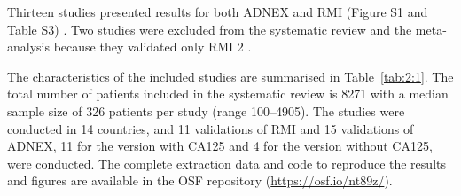 Thirteen studies presented results for both \gls{ADNEX} and \gls{RMI} (Figure S1 and Table S3)
 \cite{vancalsterValidationModelsDiagnose2020,diazOvarianTumorsRisk2017a,tugPreoperativeDiscriminatingPerformance2020,behnamfarComparisonUltrasoundTumor2022,meysEstimatingRiskMalignancy2017,qianComparisonDiagnosticPerformances2021,sandalComparisionRiskMalignancy2018a,szubertPerformanceSelectedModels2020,wangEvaluatingRiskMalignancy2023,borgesProspectiveExternalValidation2024,ounPreoperativeRiskAssessment2023,poonyakanokProspectiveComparativeTrial2023,vilendecicAccuracyIOTASimple2023}.
Two studies were excluded from the systematic review and the meta-analysis because
they validated only \gls{RMI} 2
 \cite{poonyakanokProspectiveComparativeTrial2023,vilendecicAccuracyIOTASimple2023}.

The characteristics of the included studies are summarised in Table~\ref{tab:2:1}. The total
number of patients included in the systematic review is 8271 with a median sample
size of 326 patients per study (range 100--4905). The studies were conducted in 14
countries, and 11 validations of \gls{RMI} and 15 validations of \gls{ADNEX}, 11 for the version
with CA125 and 4 for the version without CA125, were conducted. The complete
extraction data and code to reproduce the results and figures are available in the
\gls{OSF} repository (\url{https://osf.io/nt89z/}).

